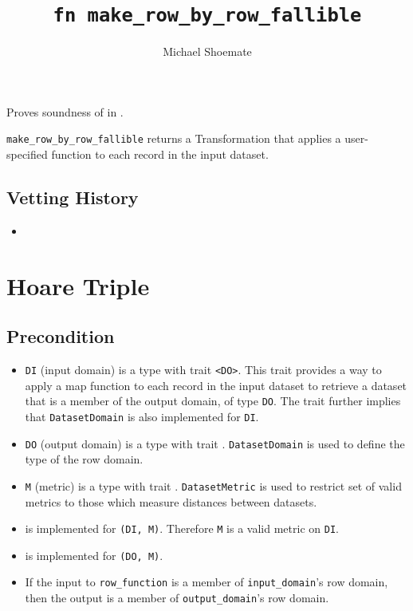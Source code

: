 \documentclass{article}
\title{\texttt{fn make\_row\_by\_row\_fallible}}
\author{Michael Shoemate}
\date{}
\begin{document}
\maketitle

\contrib
Proves soundness of  in .

\texttt{make\_row\_by\_row\_fallible} returns a Transformation that applies a user-specified function to each record in the input dataset.

\subsection*{Vetting History}
\begin{itemize}
    \item {}
\end{itemize}

\section{Hoare Triple}
\subsection*{Precondition}
\begin{itemize}

    \item \texttt{DI} (input domain) is a type with trait \texttt{<DO>}. 
        This trait provides a way to apply a map function to each record in the input dataset to retrieve a dataset that is a member of the output domain, of type \texttt{DO}. The trait further implies that \texttt{DatasetDomain} is also implemented for \texttt{DI}.
    \item \texttt{DO} (output domain) is a type with trait . 
        \texttt{DatasetDomain} is used to define the type of the row domain.
    \item \texttt{M} (metric) is a type with trait . 
        \texttt{DatasetMetric} is used to restrict set of valid metrics to those which measure distances between datasets.
    \item {} is implemented for \texttt{(DI, M)}. Therefore \texttt{M} is a valid metric on \texttt{DI}.
    \item {} is implemented for \texttt{(DO, M)}.
    \item If the input to \texttt{row\_function} is a member of \texttt{input\_domain}'s row domain, then the output is a member of \texttt{output\_domain}'s row domain.
\end{itemize}
\end{document}
